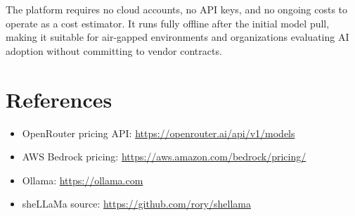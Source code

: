 \documentclass[11pt,a4paper]{article}
\begin{document}
The platform requires no cloud accounts, no API keys, and no ongoing costs to operate as a cost estimator. It runs fully offline after the initial model pull, making it suitable for air-gapped environments and organizations evaluating AI adoption without committing to vendor contracts.

\section{References}

\begin{itemize}
  \item OpenRouter pricing API: \url{https://openrouter.ai/api/v1/models}
  \item AWS Bedrock pricing: \url{https://aws.amazon.com/bedrock/pricing/}
  \item Ollama: \url{https://ollama.com}
  \item sheLLaMa source: \url{https://github.com/rory/shellama}
\end{itemize}
\end{document}
